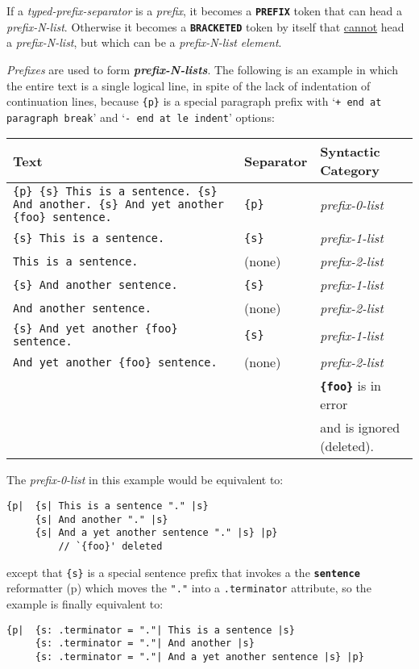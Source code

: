 \documentclass[12pt]{article}
\makeatletter
\newcommand{\TT}[1]{{\tt \bfseries #1}}
\newcommand{\emkey}[1]{{\bf \em #1}\index{#1@{\em #1}}}
\newcommand{\pagref}[1]{p\pageref{#1}}
\newenvironment{indpar}[1][0.3in]%
	{\begin{list}{}%
		     {\setlength{\itemsep}{0in}%
		      \setlength{\topsep}{0in}%
		      \setlength{\parsep}{1ex}%
		      \setlength{\labelwidth}{#1}%
		      \setlength{\leftmargin}{#1}%
		      \addtolength{\leftmargin}{\labelsep}}%
	 \item}%
	{\end{list}}
\makeatother
\begin{document}
If a {\em typed-prefix-separator} is a {\em prefix},
it becomes a \TT{PREFIX} token that can head a {\em prefix-N-list}.
Otherwise it becomes a \TT{BRACKETED} token by itself
that \underline{cannot} head a {\em prefix-N-list}, but which can
be a {\em prefix-N-list} {\em element}.

{\em Prefixes} are used to form \emkey{prefix-N-lists}.%
\label{PREFIX-0-LIST}
The following is an example in which the entire text is a single
logical line, in spite of the lack of indentation of continuation
lines, because {\tt \{p\}} is a special
paragraph prefix with `{\tt + end at paragraph break}'
and `{\tt - end at le indent}' options:


\begin{tabular}{p{3.5in}|l|l}
Text	& Separator &  Syntactic Category
\\\hline
\raggedright
\tt \{p\} \{s\} This is a sentence. \{s\} And
another.  \{s\} And yet another
\{foo\} sentence. & \tt \{p\} & \em prefix-0-list
\\\hline
\tt \{s\} This is a sentence.	& \tt \{s\} & \em prefix-1-list
\\\hline
\tt This is a sentence.	& (none) & \em prefix-2-list
\\\hline
\tt \{s\} And another sentence.  	& \tt \{s\} & \em prefix-1-list
\\\hline
\tt And another sentence. & (none) & \em prefix-2-list
\\\hline
\tt \{s\} And yet another \{foo\} sentence. & \tt \{s\} & \em prefix-1-list
\\\hline
\tt And yet another \{foo\} sentence. & (none) & \em prefix-2-list \\
			       &        & \TT{\{foo\}} is in error \\
			       &        & and is ignored (deleted).
\end{tabular}

The {\em prefix-0-list} in this example would be equivalent to:
\begin{indpar}\begin{verbatim}
{p|  {s| This is a sentence "." |s}
     {s| And another "." |s}
     {s| And a yet another sentence "." |s} |p}
         // `{foo}' deleted
\end{verbatim}\end{indpar}

except that {\tt \{s\}} is a special sentence prefix that invokes
a the \TT{sentence} reformatter (\pagref{SENTENCE-REFORMATTER})
which moves the {\tt "."} into a {\tt .terminator} attribute, so the
example is finally equivalent to:
\begin{indpar}[0.2in]\begin{verbatim}
{p|  {s: .terminator = "."| This is a sentence |s}
     {s: .terminator = "."| And another |s}
     {s: .terminator = "."| And a yet another sentence |s} |p}
\end{verbatim}\end{indpar}
\end{document}
